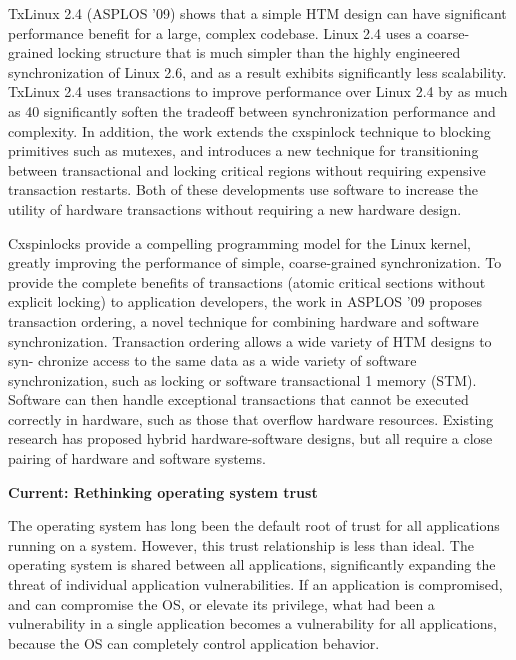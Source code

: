 \documentclass{article}
\newcommand{\codeid}[1]{{\fontsize{9pt}{12pt}\tt #1}}
\begin{document}
TxLinux 2.4 (ASPLOS ’09) shows that a simple HTM design can have
significant performance benefit for a large, complex codebase. Linux 2.4
uses a coarse-grained locking structure that is much simpler than the
highly engineered synchronization of Linux 2.6, and as a result exhibits
significantly less scalability. TxLinux 2.4 uses transactions to improve
performance over Linux 2.4 by as much as 40%
significantly soften the tradeoff between synchronization performance and
complexity. In addition, the work extends the cxspinlock technique to
blocking primitives such as mutexes, and introduces a new technique for
transitioning between transactional and locking critical regions without
requiring expensive transaction restarts. Both of these developments use
software to increase the utility of hardware transactions without requiring
a new hardware design.

Cxspinlocks provide a compelling programming model for the Linux kernel,
greatly improving the performance of simple, coarse-grained
synchronization. To provide the complete benefits of transactions (atomic
critical sections without explicit locking) to application developers, the
work in ASPLOS ’09 proposes transaction ordering, a novel technique for
combining hardware and software synchronization. Transaction ordering
allows a wide variety of HTM designs to syn- chronize access to the same
data as a wide variety of software synchronization, such as locking or
software transactional 1 memory (STM). Software can then handle exceptional
transactions that cannot be executed correctly in hardware, such as those
that overflow hardware resources. Existing research has proposed hybrid
hardware-software designs, but all require a close pairing of hardware and
software systems.


{\bigskip \noindent \bf Current: Rethinking operating system trust}

\noindent The operating system has long been the default root of trust for
all applications running on a system. However, this trust relationship is
less than ideal. The operating system is shared between all applications,
significantly expanding the threat of individual application
vulnerabilities. If an application is compromised, and can compromise the
OS, or elevate its privilege, what had been a vulnerability in a single
application becomes a vulnerability for all applications, because the OS
can completely control application behavior.

\end{document}
